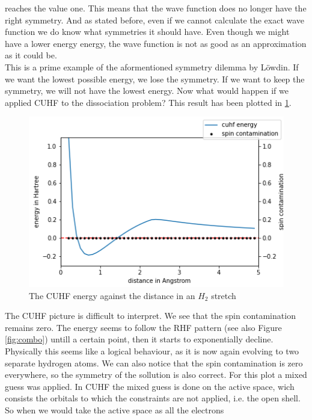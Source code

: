 \documentclass[twoside,twocolumn,9pt]{article}
\begin{document}
reaches the value one. This means that the wave function does no longer have the right symmetry. And as stated before, even if we cannot calculate the exact wave function we do know
what symmetries it should have. Even though we might have a lower energy energy, the wave function is not as good as an approximation as it could be\cite{Scuseria2013}. \\
This is a prime example of the aformentioned symmetry dilemma by Löwdin. If we want the lowest possible energy, we lose the symmetry. If we want to keep the symmetry, we will not
have the lowest energy. Now what would happen if we applied CUHF to the dissociation problem? This result has been plotted in \ref{fig:cuhfstretch}.
\begin{center}
  \begin{figure}[h]
    \includegraphics[width=\linewidth]{./../notes/figures/cuhf_mix.png}
    \caption{The CUHF energy against the distance in an $H_2$ stretch}
    \label{fig:cuhfstretch}
  \end{figure}
\end{center}
The CUHF picture is difficult to interpret. We see that the spin contamination remains zero. The energy seems to follow the RHF pattern (see also Figure \ref{fig:combo}) untill a
certain point, then it starts to exponentially decline. Physically this seems like a logical behaviour, as it is now again evolving to two separate hydrogen atoms. We can also notice
that the spin contamination is zero everywhere, so the symmetry of the sollution is also correct. For this plot a mixed guess was applied. In CUHF the mixed guess is done on the
active space, wich consists the orbitals to which the constraints are not applied, i.e. the open shell\cite{Scuseria2011}. So when we would take the active space as all the electrons
\end{document}
